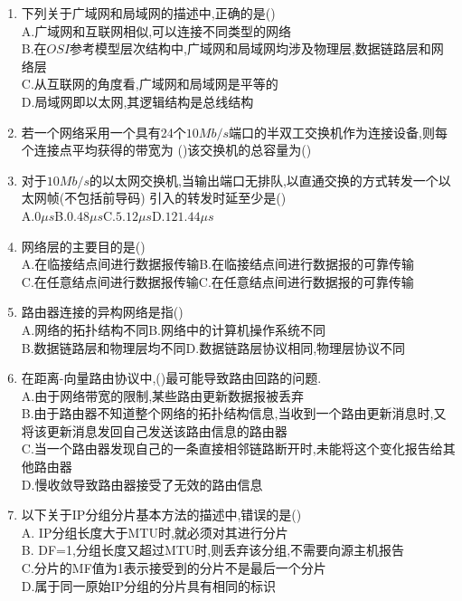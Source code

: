 \documentclass[12pt, a4paper, oneside, UTF8]{ctexbook}
\begin{document}
\begin{enumerate}
    \item 下列关于广域网和局域网的描述中,正确的是() \\
    A.广域网和互联网相似,可以连接不同类型的网络 \\
    B.在$OSI$参考模型层次结构中,广域网和局域网均涉及物理层,数据链路层和网络层 \\
    C.从互联网的角度看,广域网和局域网是平等的 \\
    D.局域网即以太网,其逻辑结构是总线结构 

    \item 若一个网络采用一个具有24个$10Mb/s$端口的半双工交换机作为连接设备,则每个连接点平均获得的带宽为
    ()该交换机的总容量为()

    \item \bt 对于$10Mb/s$的以太网交换机,当输出端口无排队,以直通交换的方式转发一个以太网帧(不包括前导码)
    引入的转发时延至少是() \\
    A.$0\mu s$\qquad B.$0.48\mu s$\qquad C.$5.12\mu s$\qquad D.$121.44\mu s$ 


    \item 网络层的主要目的是() \\
    A.在临接结点间进行数据报传输\qquad B.在临接结点间进行数据报的可靠传输 \\
    C.在任意结点间进行数据报传输\qquad C.在任意结点间进行数据报的可靠传输

    \item 路由器连接的异构网络是指() \\
    A.网络的拓扑结构不同\qquad B.网络中的计算机操作系统不同\\
    B.数据链路层和物理层均不同\qquad D.数据链路层协议相同,物理层协议不同 

    \item 在距离-向量路由协议中,()最可能导致路由回路的问题. \\
    A.由于网络带宽的限制,某些路由更新数据报被丢弃 \\
    B.由于路由器不知道整个网络的拓扑结构信息,当收到一个路由更新消息时,又将该更新消息发回自己发送该路由信息的路由器 \\
    C.当一个路由器发现自己的一条直接相邻链路断开时,未能将这个变化报告给其他路由器\\
    D.慢收敛导致路由器接受了无效的路由信息

    \item 以下关于IP分组分片基本方法的描述中,错误的是() \\
    A. IP分组长度大于MTU时,就必须对其进行分片 \\
    B. DF=1,分组长度又超过MTU时,则丢弃该分组,不需要向源主机报告 \\
    C.分片的MF值为1表示接受到的分片不是最后一个分片 \\
    D.属于同一原始IP分组的分片具有相同的标识


\end{enumerate}
\end{document}
